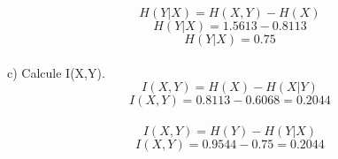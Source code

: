\documentclass[a4paper]{article}
\begin{document}
\begin{equation}
	H(Y|X) = H(X,Y) - H(X)
\end{equation}
\begin{equation}
	H(Y|X) = 1.5613 - 0.8113
\end{equation}
\begin{equation}
	H(Y|X) = 0.75
\end{equation}
\\
c) Calcule I(X,Y).
\begin{equation}
	I(X,Y) = H(X) - H(X|Y)
\end{equation}
\begin{equation}
	I(X,Y) = 0.8113 - 0.6068 = 0.2044
\end{equation}
\\
\begin{equation}
	I(X,Y) = H(Y) - H(Y|X)
\end{equation}
\begin{equation}
	I(X,Y) = 0.9544 - 0.75 = 0.2044
\end{equation}
\\










\end{document}
